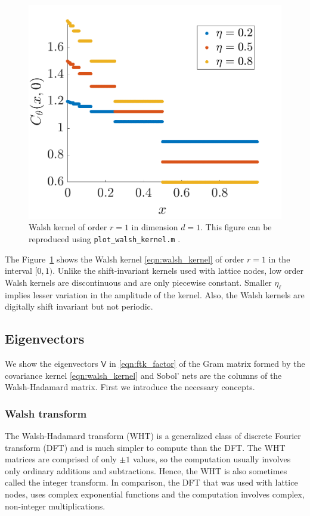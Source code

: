 \documentclass{svjour3}                     %
\newcommand{\mV}{\mathsf{V}}
\newcommand{\code}[1]{\texttt{#1}}
\newcommand\figref{Figure~\ref}
\newcommand{\JRNote}[1]{{\textcolor{green}{JR: #1}}}
\begin{document}
\begin{figure}
	\centering
	\includegraphics[width=0.9\linewidth]{"figures/walsh_kernel dim_1"}
	\caption[Walsh kernel]{Walsh kernel of order $r=1$ in dimension $d=1$. This figure can be reproduced using \code{plot\_walsh\_kernel.m} \cite{ChoEtal20a}. %
	}
	\label{fig:walshkernel-dim1}
\end{figure}

The \figref{fig:walshkernel-dim1} shows the Walsh kernel \eqref{eqn:walsh_kernel} of order $r=1$ in the interval $[0,1)$. Unlike the shift-invariant kernels used with lattice nodes, low order Walsh kernels are discontinuous and are only piecewise constant. Smaller $\eta_\ell$ implies lesser variation in the amplitude of the kernel. Also, the Walsh kernels are digitally shift invariant but not periodic.

\subsection{Eigenvectors}

We show the eigenvectors $\mV$ in \eqref{eqn:ftk_factor} of the Gram matrix formed by the covariance kernel \eqref{eqn:walsh_kernel} and Sobol' nets are the columns of the Walsh-Hadamard matrix. First we introduce the necessary concepts.

\subsubsection{Walsh transform}
The Walsh-Hadamard transform (WHT) is a generalized class of discrete Fourier transform (DFT) and is much simpler to compute than the DFT. The WHT matrices are comprised of only $\pm 1$ values, so the computation usually involves only ordinary additions and subtractions. Hence, the WHT is also sometimes called the integer transform. In comparison, the DFT that was used with lattice nodes,  uses complex exponential functions and the computation involves complex, non-integer multiplications. 
\end{document}
